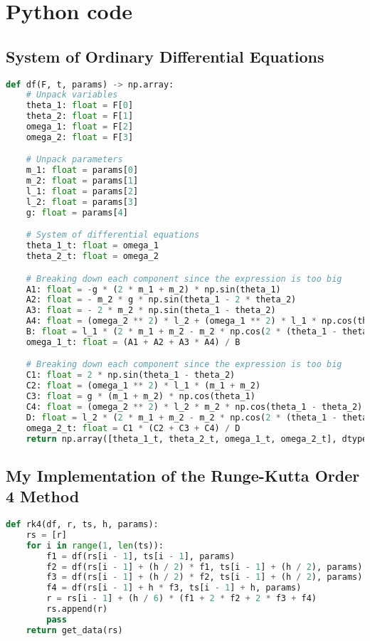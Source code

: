 \section{Python code}
\lstset{style=mystyle}

\subsection{System of Ordinary Differential Equations}
\label{subsec:system-of-ordinary-differential-equations}
\begin{lstlisting}[language=Python]
def df(F, t, params) -> np.array:
    # Unpack variables
    theta_1: float = F[0]
    theta_2: float = F[1]
    omega_1: float = F[2]
    omega_2: float = F[3]

    # Unpack parameters
    m_1: float = params[0]
    m_2: float = params[1]
    l_1: float = params[2]
    l_2: float = params[3]
    g: float = params[4]

    # System of differential equations
    theta_1_t: float = omega_1
    theta_2_t: float = omega_2

    # Breaking down each component since the expression is too big
    A1: float = -g * (2 * m_1 + m_2) * np.sin(theta_1)
    A2: float = - m_2 * g * np.sin(theta_1 - 2 * theta_2)
    A3: float = - 2 * m_2 * np.sin(theta_1 - theta_2)
    A4: float = (omega_2 ** 2) * l_2 + (omega_1 ** 2) * l_1 * np.cos(theta_1 - theta_2)
    B: float = l_1 * (2 * m_1 + m_2 - m_2 * np.cos(2 * (theta_1 - theta_2)))
    omega_1_t: float = (A1 + A2 + A3 * A4) / B

    # Breaking down each component since the expression is too big
    C1: float = 2 * np.sin(theta_1 - theta_2)
    C2: float = (omega_1 ** 2) * l_1 * (m_1 + m_2)
    C3: float = g * (m_1 + m_2) * np.cos(theta_1)
    C4: float = (omega_2 ** 2) * l_2 * m_2 * np.cos(theta_1 - theta_2)
    D: float = l_2 * (2 * m_1 + m_2 - m_2 * np.cos(2 * (theta_1 - theta_2)))
    omega_2_t: float = C1 * (C2 + C3 + C4) / D
    return np.array([theta_1_t, theta_2_t, omega_1_t, omega_2_t], dtype=float)
\end{lstlisting}

\subsection{My Implementation of the Runge-Kutta Order 4 Method}
\label{subsec:my-implementation-of-the-runge-kutta-order-4-method}
\begin{lstlisting}[language=Python]
def rk4(df, r, ts, h, params):
    rs = [r]
    for i in range(1, len(ts)):
        f1 = df(rs[i - 1], ts[i - 1], params)
        f2 = df(rs[i - 1] + (h / 2) * f1, ts[i - 1] + (h / 2), params)
        f3 = df(rs[i - 1] + (h / 2) * f2, ts[i - 1] + (h / 2), params)
        f4 = df(rs[i - 1] + h * f3, ts[i - 1] + h, params)
        r = rs[i - 1] + (h / 6) * (f1 + 2 * f2 + 2 * f3 + f4)
        rs.append(r)
        pass
    return get_data(rs)
\end{lstlisting}

